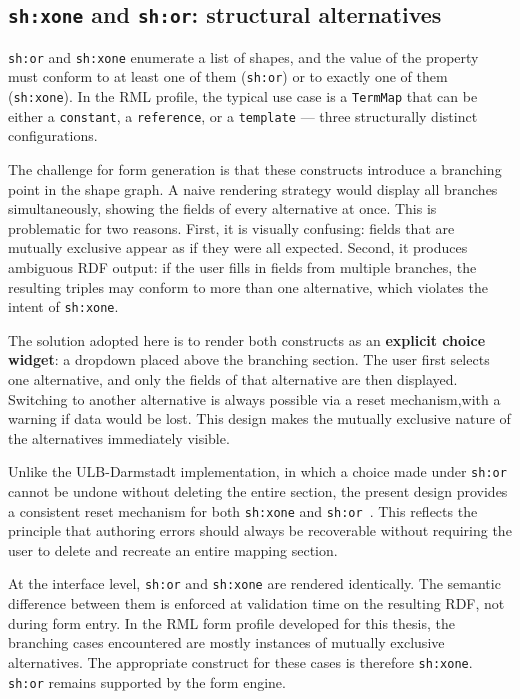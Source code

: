 \subsection{\texttt{sh:xone} and \texttt{sh:or}: structural alternatives}

\texttt{sh:or} and \texttt{sh:xone} enumerate a list of shapes, and the value of the property must conform to at least one of them (\texttt{sh:or}) or to exactly one of them (\texttt{sh:xone}).
In the RML profile, the typical use case is a \texttt{TermMap} that can be either a \texttt{constant}, a \texttt{reference}, or a \texttt{template} --- three structurally distinct configurations.

The challenge for form generation is that these constructs introduce a branching point in the shape graph.
A naive rendering strategy would display all branches simultaneously, showing the fields of every alternative at once.
This is problematic for two reasons.
First, it is visually confusing: fields that are mutually exclusive appear as if they were all expected.
Second, it produces ambiguous RDF output: if the user fills in fields from multiple branches, the resulting triples may conform to more than one alternative, which violates the intent of \texttt{sh:xone}.

The solution adopted here is to render both constructs as an \textbf{explicit choice widget}: a dropdown placed above the branching section.
The user first selects one alternative, and only the fields of that alternative are then displayed.
Switching to another alternative is always possible via a reset mechanism,with a warning if data would be lost.
This design makes the mutually exclusive nature of the alternatives immediately visible.

Unlike the ULB-Darmstadt implementation, in which a choice made under \texttt{sh:or} cannot be undone without deleting the entire section, the present design provides a consistent reset mechanism for both \texttt{sh:xone} and \texttt{sh:or}~\cite{ulb-darmstadt-shacl-form}.
This reflects the principle that authoring errors should always be recoverable without requiring the user to delete and recreate an entire mapping section.

At the interface level, \texttt{sh:or} and \texttt{sh:xone} are rendered identically.
The semantic difference between them is enforced at validation time on the resulting RDF, not during form entry.
In the RML form profile developed for this thesis, the branching cases encountered are mostly instances of mutually exclusive alternatives.
The appropriate construct for these cases is therefore \texttt{sh:xone}.
\texttt{sh:or} remains supported by the form engine.

